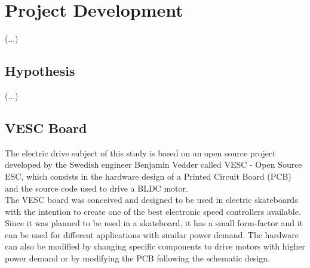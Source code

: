 \chapter{Project Development} \label{chap:implementation}

(...)\\

\section{Hypothesis}

(...)\\

\section{VESC Board}

The electric drive subject of this study is based on an open source project developed by the Swedish engineer Benjamin Vedder called VESC - Open Source ESC, which consists in the hardware design of a Printed Circuit Board (PCB) and the source code used to drive a BLDC motor.\\

The VESC board was conceived and designed to be used in electric skateboards with the intention to create one of the best electronic speed controllers available. Since it was planned to be used in a skateboard, it has a small form-factor and it can be used for different applications with similar power demand. The hardware can also be modified by changing specific components to drive motors with higher power demand or by modifying the PCB following the schematic design.

